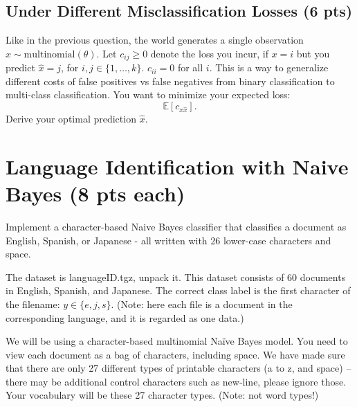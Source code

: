 \documentclass[a4paper]{article}
\theoremstyle{definition}
\def\E{\mathbb E}
\begin{document}
\subsection{Under Different Misclassification Losses (6 pts)}
Like in the previous question, the world generates a single observation $x \sim \mbox{multinomial}(\theta)$. Let $c_{ij} \ge 0$ denote the loss you incur, if $x=i$ but you predict $\hat x=j$, for $i,j \in \{1, \ldots, k\}$.
$c_{ii}=0$ for all $i$. This is a way to generalize different costs of false positives vs false negatives from binary classification to multi-class classification. You want to minimize your expected loss:
$$\E[c_{x \hat x}].$$
Derive your optimal prediction $\hat x$.

\section{Language Identification with Naive Bayes (8 pts each)}
Implement a character-based Naive Bayes classifier that classifies a document as English, Spanish, or Japanese - all written with 26 lower-case characters and space.

The dataset is languageID.tgz, unpack it. This dataset consists of 60 documents in English, Spanish, and Japanese. The correct class label is the first character of the filename: $y \in \{e, j, s\}$. (Note: here each file is a document in the corresponding language, and it is regarded as one data.)

We will be using a character-based multinomial Naïve Bayes model. You need to view each document as a bag of characters, including space. We have made sure that there are only 27 different types of printable characters (a to z, and space) -- there may be additional control characters such as new-line, please ignore those. Your vocabulary will be these 27 character types. (Note: not word types!)
\end{document}
